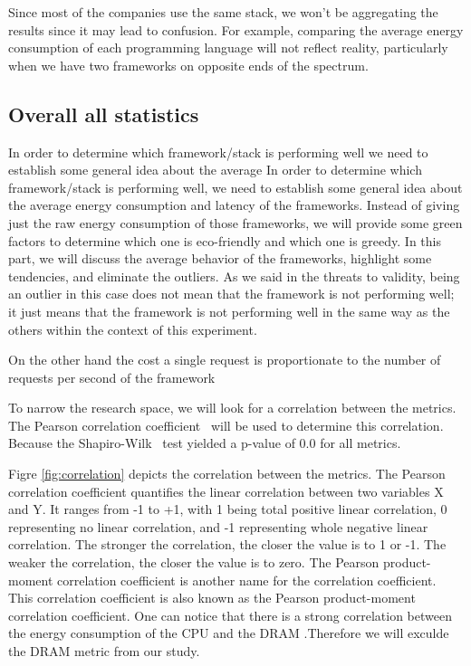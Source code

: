 Since most of the companies use the same stack, we won't be aggregating the results since it may lead to confusion.
For example, comparing the average energy consumption of each programming language will not reflect reality, particularly when we have two frameworks on opposite ends of the spectrum. 

\subsection{Overall all statistics}
In order to determine which framework/stack is performing well we need to establish some general idea about the average In order to determine which framework/stack is performing well, we need to establish some general idea about the average energy consumption and latency of the frameworks. Instead of giving just the raw energy consumption of those frameworks, we will provide some green factors to determine which one is eco-friendly and which one is greedy.
In this part, we will discuss the average behavior of the frameworks, highlight some tendencies, and eliminate the outliers.
As we said in the threats to validity, being an outlier in this case does not mean that the framework is not performing well; it just means that the framework is not performing well in the same way as the others within the context of this experiment.

On the other hand the cost a single request is proportionate to the number of requests per second of the framework 

To narrow the research space, we will look for a correlation between the metrics. The Pearson correlation coefficient~\cite{zar2005spearman} will be used to determine this correlation. Because the Shapiro-Wilk~\cite{shapiro1968comparative} test yielded a p-value of 0.0 for all metrics.

Figre \ref{fig:correlation} depicts the correlation between the metrics. The Pearson correlation coefficient quantifies the linear correlation between two variables X and Y. It ranges from -1 to +1, with 1 being total positive linear correlation, 0 representing no linear correlation, and -1 representing whole negative linear correlation. The stronger the correlation, the closer the value is to 1 or -1. The weaker the correlation, the closer the value is to zero. The Pearson product-moment correlation coefficient is another name for the correlation coefficient. This correlation coefficient is also known as the Pearson product-moment correlation coefficient.
One can notice that there is a strong correlation between the energy consumption of the CPU  and the DRAM .Therefore we will exculde the DRAM metric from our study. 

